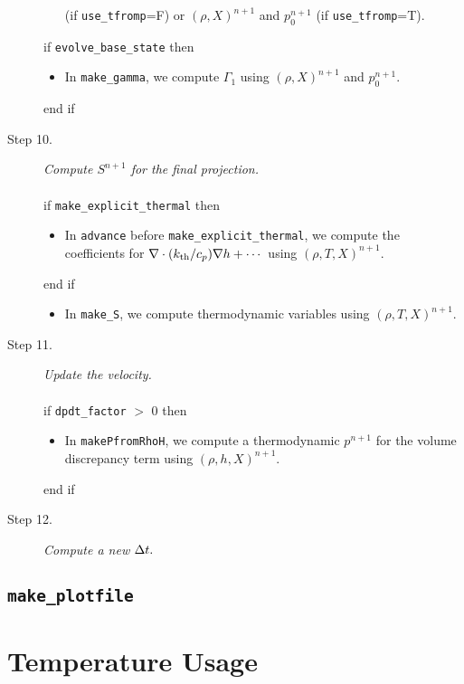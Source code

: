 \begin{description}
\begin{itemize}
(if {\tt use\_tfromp}=F) or $(\rho,X)^{n+1}$ and $p_0^{n+1}$ (if {\tt use\_tfromp}=T).
\end{itemize}
if {\tt evolve\_base\_state} then
\begin{itemize}
\item In {\tt make\_gamma}, we compute $\Gamma_1$ using $(\rho,X)^{n+1}$ and $p_0^{n+1}$.
\end{itemize}
end if
\item[Step 10.] {\em Compute $S^{n+1}$ for the final projection.}\\ \\
if {\tt make\_explicit\_thermal} then
\begin{itemize}
\item In {\tt advance} before {\tt make\_explicit\_thermal}, we compute the coefficients for 
$\nabla\cdot(k_{\rm th}/c_p)\nabla h + \cdots$ using $(\rho,T,X)^{n+1}$.
\end{itemize}
end if
\begin{itemize}
\item In {\tt make\_S}, we compute thermodynamic variables using $(\rho,T,X)^{n+1}$.
\end{itemize}
\item[Step 11.] {\em Update the velocity.}\\ \\
if {\tt dpdt\_factor} $>$ 0 then
\begin{itemize}
\item In {\tt makePfromRhoH}, we compute a thermodynamic $p^{n+1}$ for the volume 
discrepancy term using $(\rho,h,X)^{n+1}$.
\end{itemize}
end if
\item[Step 12.] {\em Compute a new $\Delta t.$}
\end{description}
\subsection{{\tt make\_plotfile}}
\section{Temperature Usage}
